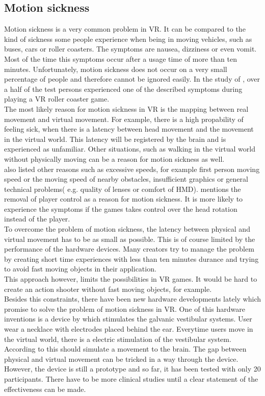 \subsection{Motion sickness}
Motion sickness is a very common problem in VR. It can be compared to the kind of sickness some people experience when being in moving vehicles, such as buses, cars or roller coasters. The symptoms are nausea, dizziness or even vomit. Most of the time this symptoms occur after a usage time of more than ten minutes. Unfortunately, motion sickness does not occur on a very small percentage of people and therefore cannot be ignored easily. In the study of \cite{Siess.2017}, over a half of the test persons experienced one of the described symptoms during playing a VR roller coaster game.\\
The most likely reason for motion sickness in VR is the mapping between real movement and virtual movement. For example, there is a high propability of feeling sick, when there is a latency between head movement and the movement in the virtual world. This latency  will be registered by the brain and is experienced as unfamiliar. Other situations, such as walking in the virtual world without physically moving can be a reason for motion sickness as well. \cite{Dorner.2013} \\ \cite{Siess.2017} also listed other reasons such as excessive speeds, for example first person moving speed or the moving speed of nearby obstacles, insufficient graphics or general technical problems( e.g. quality of lenses or comfort of HMD).
\cite{Fenlon.2013} mentions the removal of player control as a reason for motion sickness. It is more likely to experience the symptoms if the games takes control over the head rotation instead of the player. \\
To overcome the problem of motion sickness, the latency between physical and virtual movement has to be as small as possible. This is of course limited by the performance of the hardware devices. Many creators try to manage the problem by creating short time experiences with less than ten minutes durance and trying to avoid fast moving objects in their application. \cite{Doerner.2013}\\
This approach however, limits the possibilities in VR games. It would be hard to create an action shooter without fast moving objects, for example. \\
Besides this constraints, there have been new hardware developments lately which promise to solve the problem of motion sickness in VR. One of this hardware inventions is a device by \cite{Sra:2019} which stimulates the galvanic vestibular systems. User wear a necklace with electrodes placed behind the ear. Everytime users move in the virtual world, there is a electric stimulation of the vestibular system. According to \cite{Sra:2019} this should simulate a movement to the brain. The gap between physical and virtual movement can be tricked in a way through the device. However, the device is still a prototype and so far, it has been tested with only 20 participants. There have to be more clinical studies until a clear statement of the effectiveness can be made.\\
